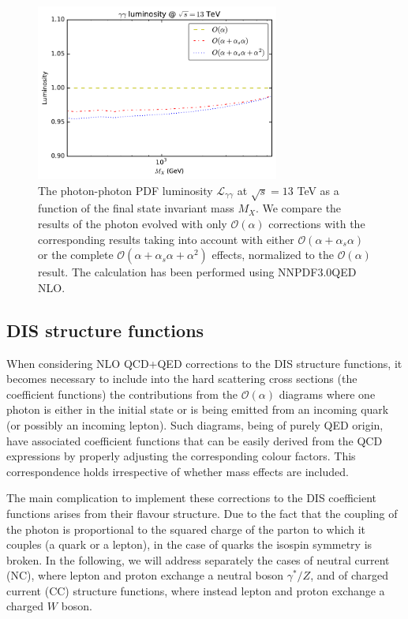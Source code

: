 \begin{figure}[t]
\includegraphics[width=8cm]{figs/lumi_13tev.pdf} 
\caption{The photon-photon PDF luminosity $\mathcal{L}_{\gamma\gamma}$ at $\sqrt{s} = 13$ TeV as a
  function of the final state invariant mass $M_X$.
  We compare the results of the photon evolved
  with only $\mathcal{O}(\alpha)$ corrections
  with the corresponding results taking into account with either
  $\mathcal{O}(\alpha+\alpha_s\alpha)$
  or the complete
  $\mathcal{O}(\alpha+\alpha_s\alpha+\alpha^2)$ effects,
  normalized to the $\mathcal{O}(\alpha)$ result.
  The calculation has been performed using NNPDF3.0QED NLO.  }
\label{fig:GammaGammaLumi}
\end{figure}



\subsection{DIS structure functions}

When considering NLO QCD+QED corrections to the DIS structure
functions, it becomes necessary to
include into the hard scattering cross sections (the coefficient
functions) the contributions from the
$\mathcal{O}(\alpha)$ diagrams where one photon is either in the
initial state or is being emitted from an incoming quark (or possibly an
incoming lepton).
%
Such diagrams, being of purely QED origin, have
associated coefficient functions that can be
easily derived from the QCD expressions
by properly adjusting the corresponding colour factors.
%
This
correspondence holds irrespective
of whether mass effects are included.

The main complication to implement these
corrections to the DIS
coefficient functions
arises from their flavour structure.
%
Due to the fact that the coupling of the photon is proportional to the
squared charge of the parton to which it couples (a quark or a
lepton), in the case of quarks the isospin symmetry is broken.
%
In the
following, we will address  separately
the cases of neutral current (NC), where
lepton and proton exchange a neutral boson $\gamma^*/Z$, and of
charged current (CC) structure functions, where instead
lepton and proton exchange a charged $W$ boson.


